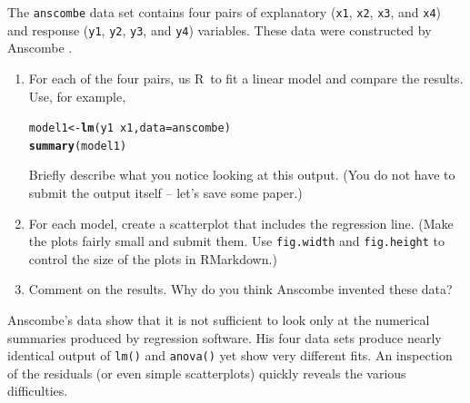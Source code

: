 \documentclass[twoside]{book}\usepackage[]{graphicx}\usepackage[]{xcolor}
\makeatletter
\newcommand{\hlopt}[1]{\textcolor[rgb]{0,0,0}{#1}}%
\newcommand{\hlstd}[1]{\textcolor[rgb]{0.345,0.345,0.345}{#1}}%
\newcommand{\hlkwb}[1]{\textcolor[rgb]{0.69,0.353,0.396}{#1}}%
\newcommand{\hlkwc}[1]{\textcolor[rgb]{0.333,0.667,0.333}{#1}}%
\newcommand{\hlkwd}[1]{\textcolor[rgb]{0.737,0.353,0.396}{\textbf{#1}}}%
\newenvironment{kframe}{%
 \def\at@end@of@kframe{}%
 \ifinner\ifhmode%
  \def\at@end@of@kframe{\end{minipage}}%
  \begin{minipage}{\columnwidth}%
 \fi\fi%
 \def\FrameCommand##1{\hskip\@totalleftmargin \hskip-\fboxsep
 \colorbox{shadecolor}{##1}\hskip-\fboxsep
     \hskip-\linewidth \hskip-\@totalleftmargin \hskip\columnwidth}%
 \MakeFramed {\advance\hsize-\width
   \@totalleftmargin\z@ \linewidth\hsize
   \@setminipage}}%
 {\par\unskip\endMakeFramed%
 \at@end@of@kframe}
\newenvironment{knitrout}{}{} %
\newcommand{\variable}[1]{{\color{green!50!black}\texttt{#1}}}
\newcommand{\Rindex}[1]{\index{\texttt{#1}}}
\newcommand{\dataframe}[1]{{\color{blue!80!black}\texttt{#1}}\Rindex{#1}}
\def\R{{\sf R}}
\newcounter{example}[section]
\makeatother
\begin{document}
\begin{problem}
	The \dataframe{anscombe} data set contains four pairs of explanatory 
	(\variable{x1}, \variable{x2}, \variable{x3}, and \variable{x4})
	and response
	(\variable{y1}, \variable{y2}, \variable{y3}, and \variable{y4})
	variables.  These data were constructed by Anscombe 
	\cite{Anscombe:1973:Graphs}.
	\begin{enumerate}
		\item 
			For each of the four pairs, us \R\ to fit a linear model and 
			compare the results.  Use, for example,
\begin{knitrout}
\color{fgcolor}\begin{kframe}
\begin{alltt}
\hlstd{model1} \hlkwb{<-} \hlkwd{lm}\hlstd{(y1} \hlopt{~} \hlstd{x1,} \hlkwc{data} \hlstd{= anscombe)}
\hlkwd{summary}\hlstd{(model1)}
\end{alltt}
\end{kframe}
\end{knitrout}
			Briefly describe what you notice looking at this output.  (You do not have
			to submit the output itself -- let's save some paper.)
		\item
			For each model, create a scatterplot that includes the regression line.
			(Make the plots fairly small and submit them.
			Use \texttt{fig.width} and \texttt{fig.height} to control the size of 
			the plots in RMarkdown.)
		\item
			Comment on the results.  Why do you think Anscombe invented these data?
	\end{enumerate}
\end{problem}

\begin{solution}
  Anscombe's data show that it is not sufficient to look only at the 
  numerical summaries produced by regression software.  His four data
  sets produce nearly identical output of \verb!lm()! and \verb!anova()!
  yet show very different fits.  An inspection of the residuals (or even
  simple scatterplots) quickly reveals the various difficulties.
\end{solution}
\end{document}
